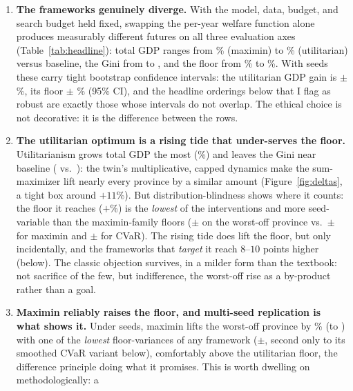 \documentclass[11pt,a4paper]{article}
\begin{document}
\begin{enumerate}
    \item \textbf{The frameworks genuinely diverge.} With the model, data,
    budget, and search budget held fixed, swapping the per-year welfare
    function alone produces measurably different futures on all three
    evaluation axes (Table~\ref{tab:headline}): total GDP ranges from
    \cmpRawlsGdpDelta\% (maximin) to \cmpUtilGdpDelta\% (utilitarian) versus
    baseline, the Gini from \cmpCvarGini{} to \cmpWellGini{}, and the floor from
    \cmpUtilWorstDelta\% to \cmpEgalWorstDelta\%. With \cmpSeeds{} seeds these
    carry tight bootstrap confidence intervals: the utilitarian GDP gain is
    \cmpUtilGdpDelta$\pm$\cmpUtilGdpCI\%, its floor \cmpUtilWorstDelta$\pm$%
    \cmpUtilWorstCI\% (95\% CI), and the headline orderings below that I
    flag as robust are exactly those whose intervals do not overlap. The ethical
    choice is not decorative: it is the difference between the rows.
    \item \textbf{The utilitarian optimum is a rising tide that under-serves the
    floor.} Utilitarianism grows total GDP the most (\cmpUtilGdpDelta\%) and
    leaves the Gini near baseline (\cmpUtilGini{} vs.\ \baseGini): the twin's
    multiplicative, capped dynamics make the sum-maximizer lift nearly every
    province by a similar amount (Figure~\ref{fig:deltas}, a tight box around
    $+11\%$). But distribution-blindness shows where it counts: the floor it
    reaches ($+$\cmpUtilWorstDelta\%) is the \emph{lowest} of the interventions
    and more seed-variable than the maximin-family floors
    ($\pm$\cmpUtilWorstStd{} on the worst-off province vs.\
    $\pm$\cmpRawlsWorstStd{} for maximin and $\pm$\cmpCvarWorstStd{} for CVaR).
    The rising tide does lift the floor, but only incidentally, and the
    frameworks that \emph{target} it reach $8$--$10$ points higher (below). The
    classic objection survives, in a milder form than the textbook: not
    sacrifice of the few, but indifference, the worst-off rise as a
    by-product rather than a goal.
    \item \textbf{Maximin reliably raises the floor, and multi-seed
    replication is what shows it.} Under \cmpSeeds{} seeds, maximin lifts the
    worst-off province by \cmpRawlsWorstDelta\% (to \cmpRawlsWorst) with one of
    the \emph{lowest} floor-variances of any framework ($\pm$\cmpRawlsWorstStd,
    second only to its smoothed CVaR variant below),
    comfortably above the utilitarian floor, the difference principle doing
    what it promises. This is worth dwelling on methodologically: a

\end{enumerate}
\end{document}
